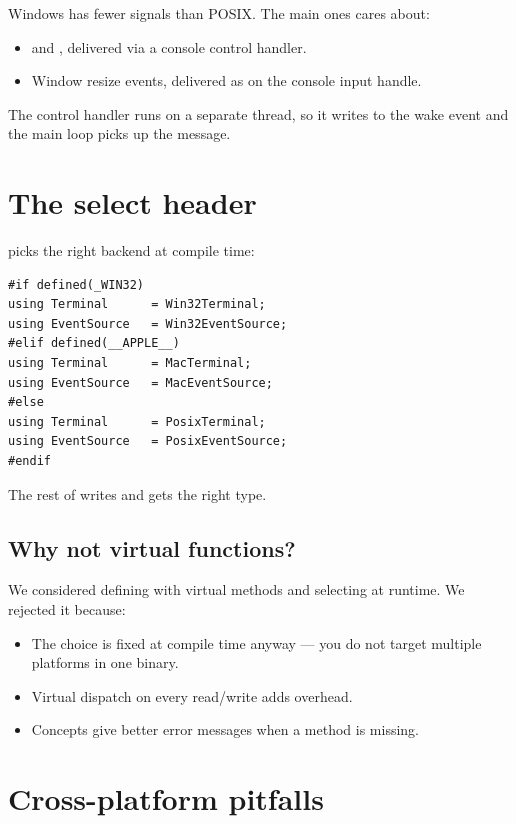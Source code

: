 Windows has fewer signals than POSIX. The main ones \maya{}
cares about:

\begin{itemize}[leftmargin=*]
  \item {} and ,
    delivered via a console control handler.
  \item Window resize events, delivered as
     on the console input
    handle.
\end{itemize}

The control handler runs on a separate thread, so it writes to
the wake event and the main loop picks up the message.

\section{The select header}

 picks the right
backend at compile time:

\begin{lstlisting}
#if defined(_WIN32)
using Terminal      = Win32Terminal;
using EventSource   = Win32EventSource;
#elif defined(__APPLE__)
using Terminal      = MacTerminal;
using EventSource   = MacEventSource;
#else
using Terminal      = PosixTerminal;
using EventSource   = PosixEventSource;
#endif
\end{lstlisting}

The rest of \maya{} writes  and
gets the right type.

\subsection*{Why not virtual functions?}

We considered defining  with virtual methods and
selecting at runtime. We rejected it because:

\begin{itemize}[leftmargin=*]
  \item The choice is fixed at compile time anyway --- you do
    not target multiple platforms in one binary.
  \item Virtual dispatch on every read/write adds overhead.
  \item Concepts give better error messages when a method is
    missing.
\end{itemize}

\section{Cross-platform pitfalls}


